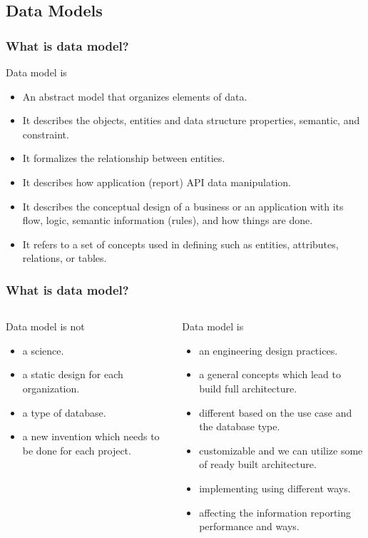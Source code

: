 \subsection{Data Models}
\begin{frame}
\frametitle{What is data model?}
Data model is
	\begin{itemize}[<+->]
		\item An abstract model that organizes elements of data.
		\item It describes the objects, entities and data structure properties, semantic, and constraint.
		\item It formalizes the relationship between entities.
		\item It describes how application (report) API data manipulation.
		\item It describes the conceptual design of a business or an application with its flow, logic, semantic information (rules), and how things are done.
		\item It refers to a set of concepts used in defining such as entities, attributes, relations, or tables.
	\end{itemize}
\end{frame}

\begin{frame}
\frametitle{What is data model?}

\begin{columns}[T] %
	\begin{column}{.45\textwidth}
		Data model is not	
		\begin{itemize}
			\item a science.
			\item a static design for each organization.
			\item a type of database.
			\item a new invention which needs to be done for each project.
		\end{itemize}
		
		\end{column}%
		\hfill%
		\begin{column}{.45\textwidth}
		Data model is		
			\begin{itemize}
				\item an engineering design practices.
				\item a general concepts which lead to build full architecture.
				\item different based on the use case and the database type.
				\item customizable and we can utilize some of ready built architecture. 
				\item implementing using different ways.
				\item affecting the information reporting performance and ways.
			\end{itemize}
		
		\end{column}%
	\end{columns}

\end{frame}

